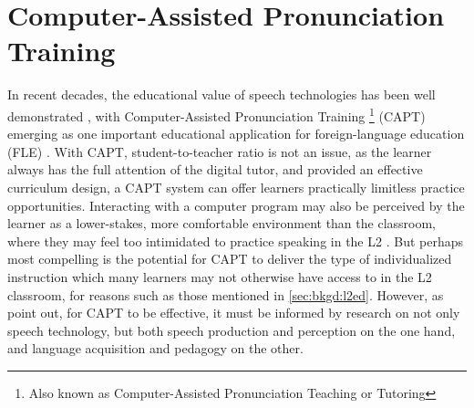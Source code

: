 

\section{Computer-Assisted Pronunciation Training}
\label{sec:bkgd:capt}


In recent decades, the educational value of speech technologies has been well demonstrated \citep{Eskenazi2009}, with 
Computer-Assisted Pronunciation Training%
\footnote{Also known as Computer-Assisted Pronunciation Teaching or Tutoring} (CAPT) 
emerging as one important educational application for foreign-language education (FLE) \citep{Neri2002,Delmonte2011,Witt2012}. 
With CAPT, student-to-teacher ratio is not an issue, as the learner always has the full attention of the digital tutor, and provided an effective curriculum design, a CAPT system can offer learners practically limitless practice opportunities. Interacting with a computer program may also be perceived by the learner as a lower-stakes, more comfortable environment than the classroom, where they may feel too intimidated to practice speaking in the L2 \citep{Neri2002}. But perhaps most compelling is the potential for CAPT 
to deliver the type of individualized instruction
which many learners may not otherwise have access to in the L2 classroom, for reasons such as those mentioned in \cref{sec:bkgd:l2ed}.
%
However, as \textcite{Derwing2005} point out, for CAPT to be effective, it must be informed by research on not only speech technology, but both speech production and perception on the one hand, and language acquisition and pedagogy on the other.
